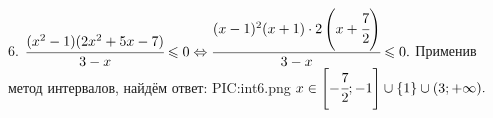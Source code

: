 6. $\cfrac{(x^2-1)(2x^2+5x-7)}{3-x}\leqslant0\Leftrightarrow\cfrac{(x-1)^2(x+1)\cdot 2\left(x+\cfrac{7}{2}\right)}{3-x}\leqslant0.$ Применив метод интервалов, найдём ответ:
{{PIC:int6.png}}
$x\in\left[-\cfrac{7}{2};-1\right]\cup\{1\}\cup(3;+\infty).$\\
